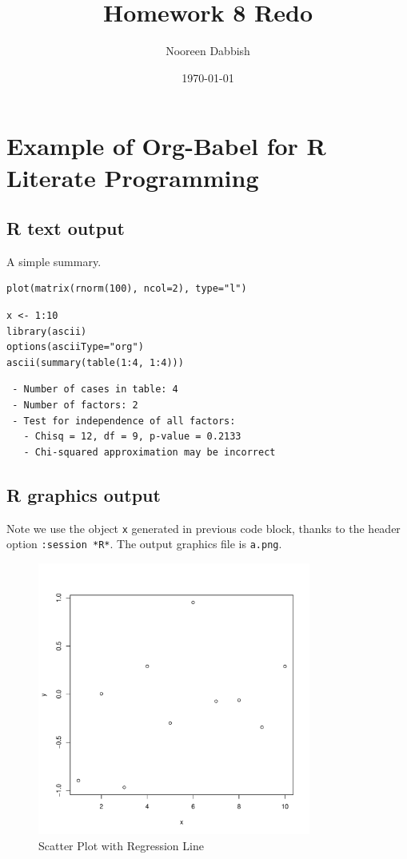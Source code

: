 \documentclass[11pt]{article}
\title{Homework 8 Redo}
\author{Nooreen Dabbish}
\date{\today}
\begin{document}
\maketitle

\section{Example of Org-Babel for R Literate Programming}
\label{sec-1}
\subsection{R text output}
\label{sec-1-1}

A simple summary. 




\begin{verbatim}
plot(matrix(rnorm(100), ncol=2), type="l")
\end{verbatim}




\begin{verbatim}
x <- 1:10
library(ascii)
options(asciiType="org")
ascii(summary(table(1:4, 1:4)))
\end{verbatim}

\begin{verbatim}
 - Number of cases in table: 4 
 - Number of factors: 2 
 - Test for independence of all factors:
   - Chisq = 12, df = 9, p-value = 0.2133
   - Chi-squared approximation may be incorrect
\end{verbatim}
\subsection{R graphics output}
\label{sec-1-2}

Note we use the object \texttt{x} generated in previous code block, thanks to
the header option \texttt{:session *R*}.  The output graphics file is
\texttt{a.png}. 





\begin{figure}[p]
\centering
\includegraphics[width=0.8\textwidth,]{a.pdf}
\caption{\label{fig:one}Scatter Plot with Regression Line}
\end{figure}
\end{document}
